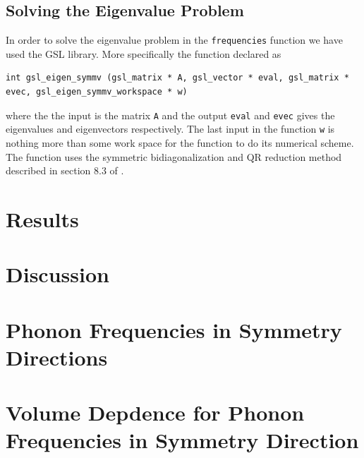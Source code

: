 \documentclass[11pt]{article}
\newlength\figureheight
\newlength\figurewidth
\newif\iftikz
\begin{document}
\subsection{Solving the Eigenvalue Problem}
In order to solve the eigenvalue problem in the \verb+frequencies+ function we have used the GSL library. More specifically the function declared as
\begin{lstlisting}
int gsl_eigen_symmv (gsl_matrix * A, gsl_vector * eval, gsl_matrix * evec, gsl_eigen_symmv_workspace * w)
\end{lstlisting}
where the the input is the matrix \verb+A+ and the output \verb+eval+ and \verb+evec+ gives the eigenvalues and eigenvectors respectively. The last input in the function \verb+w+ is nothing more than some work space for the function to do its numerical scheme. The function uses the symmetric bidiagonalization and QR reduction method described in section 8.3 of \cite{bib:num}.

\newpage
\section{Results}
\iftikz
\begin{figure}[H]
	\centering
	\setlength\figureheight{8cm} 
	\setlength\figurewidth{14cm}
	
	\caption{The dispersion relation plotted in different symmetry directions for different rare gases.}
	\label{fig:Ne440}
\end{figure}
\fi
\section{Discussion}
\appendix
\section{Phonon Frequencies in Symmetry Directions}
\iftikz
\begin{figure}[H]
	\centering
	\setlength\figureheight{15cm} 
	\setlength\figurewidth{15cm}
	
	\caption{The dispersion relation plotted in different symmetry directions for different rare gases. The x-axis shows the position in the lattice as it goes in different symmetry directions.}
	\label{fig:Freq}
\end{figure}
\fi
\newpage
\section{Volume Depdence for Phonon Frequencies in Symmetry Direction}
\iftikz
\begin{figure}[H]
	\centering
	\setlength\figureheight{18cm} 
	\setlength\figurewidth{14cm}
	
	\caption{The dispersion relation plotted in different symmetry directions for different rare gases.}
	\label{fig:VolDep}
\end{figure}
\fi
\newpage
\end{document}
